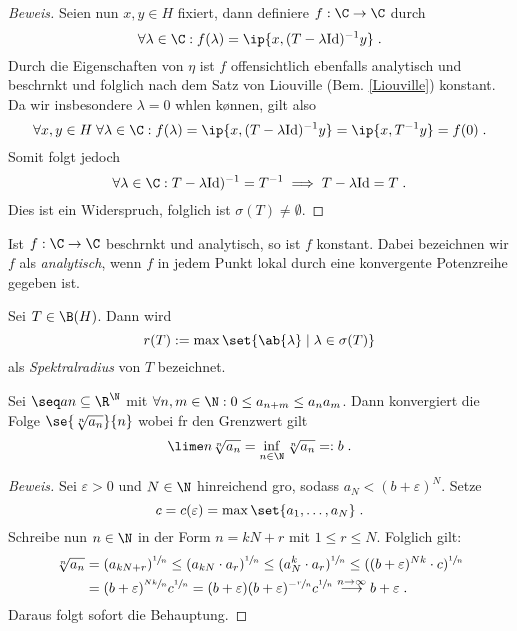 \begin{proof}[Beweis]
		Seien nun \(x,y\in H\) fixiert, dann definiere \(f:\C \to \C\) durch 
		\[\forall \lambda \in \C: f(\lambda) = \ip{x, (T-\lambda \text{Id})^{-1}y}\;.\]
		Durch die Eigenschaften von $\eta$ ist $f$ offensichtlich ebenfalls analytisch und beschr\as nkt und folglich nach dem Satz von Liouville (Bem. \ref{Liouville}) konstant. Da wir insbesondere \(\lambda = 0\) w\as hlen k\o nnen, gilt also 
		\[\forall x, y\in H\;\forall \lambda \in \C: f(\lambda) = \ip{x, (T-\lambda \text{Id})^{-1}y} = \ip {x, T^{-1}y} = f(0)\;.\]
		Somit folgt jedoch 
		\[\forall \lambda \in \C: T-\lambda \text{Id})^{-1} = T^{-1} \implies T - \lambda\text{Id} = T\;.\]
		Dies ist ein Widerspruch, folglich ist \(\sigma(T) \neq \emptyset\).
	\end{proof}
	\begin{rem} \label{Liouville}
		Ist \(f:\C \to \C\) beschr\as nkt und analytisch, so ist $f$ konstant. Dabei bezeichnen wir $f$ als \textit{analytisch}, wenn $f$ in jedem Punkt lokal durch eine konvergente Potenzreihe gegeben ist.
	\end{rem}
	
	\begin{definition}
		Sei \(T\in \B(H)\). Dann wird 
		\[r(T) := \max\set{\ab{\lambda}\;\vert\; \lambda \in \sigma(T)}\]
		als \textit{Spektralradius} von $T$ bezeichnet. 
	\end{definition}
	
	\begin{lemma}
		\label{Lemma_Spektralradius}
		Sei \(\seq an \subseteq \R^\N\) mit \(\forall n,m\in\N: 0 \leq a_{n+m} \leq a_n a_m\). Dann konvergiert die Folge \(\se{\sqrt[n]{a_n}}{n}\) wobei f\us r den Grenzwert gilt
		\[\lime n \sqrt[n]{a_n} = \inf_{n\in\N} \sqrt[n]{a_n}=: b\;.\]
	\end{lemma}
	\begin{proof}[Beweis]
		Sei \(\varepsilon > 0\) und \(N\in\N\) hinreichend gro\s{}, sodass \(a_N < (b+\varepsilon)^N\). Setze
		\[c = c(\varepsilon) = \max\set{a_1,\ldots, a_N}\;.\]
		Schreibe nun \(n\in \N\) in der Form \(n = kN + r\) mit \(1\leq r \leq N\). Folglich gilt:
		\begin{align*}
			\sqrt[n]{a_n} &= (a_{kN+r})^{\sfrac 1n} \leq (a_{kN} \cdot a_r)^{\sfrac 1n} \leq (a_{N}^k \cdot a_r)^{\sfrac 1n} \leq ((b+\varepsilon)^{Nk} \cdot c)^{\sfrac 1n}\\
			&= (b + \varepsilon)^{\sfrac{Nk}{n}} c^{\sfrac 1n} = (b+\varepsilon)(b+\varepsilon)^{-\sfrac rn}c ^{\sfrac 1n} \overset{n\to\infty}{\longrightarrow} b + \varepsilon\;.
		\end{align*}
		Daraus folgt sofort die Behauptung.
	\end{proof}
	
